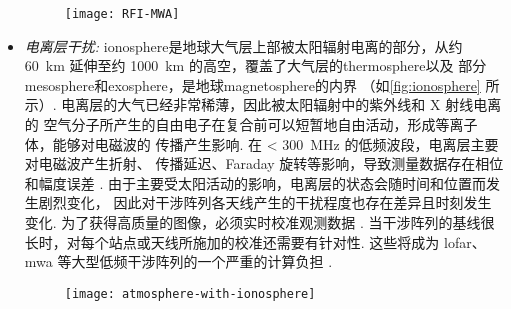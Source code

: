 \begin{itemize}
\begin{figure}[tbp]
  \centering
  \texttt{[image: RFI-MWA]}
  \label{fig:rfi-mwa}
\end{figure}

\item
\emph{电离层干扰:}
\acf{ionosphere}是地球大气层上部被太阳辐射电离的部分，从约 \SI{60}{\km}
延伸至约 \SI{1000}{\km} 的高空，覆盖了大气层的\ac{thermosphere}以及
部分\ac{mesosphere}和\ac{exosphere}，是地球\ac{magnetosphere}的内界
（如\autoref{fig:ionosphere} 所示）.
电离层的大气已经非常稀薄，因此被太阳辐射中的紫外线和 X 射线电离的
空气分子所产生的自由电子在复合前可以短暂地自由活动，形成等离子体，能够对电磁波的
传播产生影响.
在 \SI{< 300}{\MHz} 的低频波段，电离层主要对电磁波产生折射、
传播延迟、Faraday 旋转等影响，导致测量数据存在相位和幅度误差
\cite{intema2009,thompson2017}.
由于主要受太阳活动的影响，电离层的状态会随时间和位置而发生剧烈变化，
因此对干涉阵列各天线产生的干扰程度也存在差异且时刻发生变化.
为了获得高质量的图像，必须实时校准观测数据 \cite{intema2009,jordan2017}.
当干涉阵列的基线很长时，对每个站点或天线所施加的校准还需要有针对性.
这些将成为 \ac{lofar}、\ac{mwa} 等大型低频干涉阵列的一个严重的计算负担
\cite{intema2009,deGasperin2018}.

\begin{figure}[tbp]
  \centering
  \texttt{[image: atmosphere-with-ionosphere]}
  \label{fig:ionosphere}
\end{figure}


\end{itemize}
